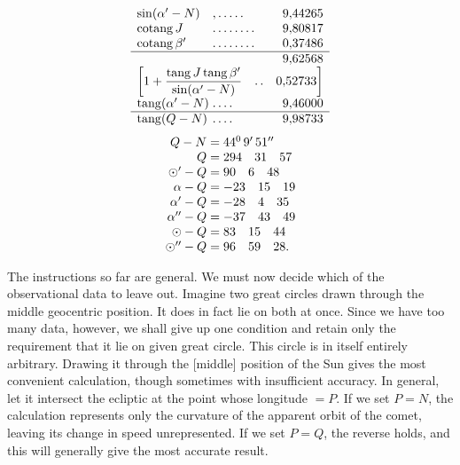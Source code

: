 \[
\begin{array}{l@{\;}l@{\;}r}
\sin(\alpha'-N)&\mathord{,}\,\mathord{.}\,\mathord{.}\,\mathord{.}\,\mathord{.}\,\mathord{.}&9{,}44265\\
\operatorname{cotang}J&\mathord{.}\,\mathord{.}\,\mathord{.}\,\mathord{.}\,\mathord{.}\,\mathord{.}\,\mathord{.}\,\mathord{.}&9{,}80817\\
\operatorname{cotang}\beta'&\mathord{.}\,\mathord{.}\,\mathord{.}\,\mathord{.}\,\mathord{.}\,\mathord{.}\,\mathord{.}\,\mathord{.}&0{,}37486\\\hline
&&9{,}62568\\
\multicolumn{3}{l}{\left[1+\dfrac{\operatorname{tang}J\operatorname{tang}\beta'}{\sin(\alpha'-N)}\quad\mathord{.}\,\mathord{.}\quad0{,}52733\right]}\\
\operatorname{tang}(\alpha'-N)&\mathord{.}\,\mathord{.}\,\mathord{.}\,\mathord{.}&9{,}46000\\\hline
\operatorname{tang}(Q-N)&\mathord{.}\,\mathord{.}\,\mathord{.}\,\mathord{.}&9{,}98733
\end{array}
\]
\[
\begin{array}{r@{\;}l}
Q-N=&44^{0}\,9'\,51''\\
Q=&294\quad31\quad57\\
\odot'-Q=&90\quad6\quad48\\
\alpha-Q=&-23\quad15\quad19\\
\alpha'-Q=&-28\quad4\quad35\\
\alpha''-Q=&-37\quad43\quad49\\
\odot-Q=&83\quad15\quad44\\
\odot''-Q=&96\quad59\quad28.
\end{array}
\]

The instructions so far are general. We must now decide which of the observational data to leave out. Imagine two great circles drawn through the middle geocentric position. It does in fact lie on both at once. Since we have too many data, however, we shall give up one condition and retain only the requirement that it lie on  given great circle. This circle is in itself entirely arbitrary. Drawing it through the [middle] position of the Sun gives the most convenient calculation, though sometimes with insufficient accuracy. In general, let it intersect the ecliptic at the point whose longitude \(=P\). If we set \(P=N\), the calculation represents only the curvature of the apparent orbit of the comet, leaving its change in speed unrepresented. If we set \(P=Q\), the reverse holds, and this will generally give the most accurate result.

